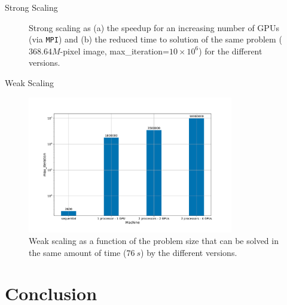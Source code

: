 \documentclass[10pt]{beamer}
\begin{document}
\begin{frame}{Strong Scaling}
\begin{figure}
\begin{subfigure}{.6\textwidth}
			\caption{} 
			\label{fig:strong-tts}
		\end{subfigure}
		\vspace{-0.4cm}
		\caption{Strong scaling as (a) the speedup for an increasing number of GPUs (via \texttt{MPI}) and (b) the reduced time to solution of the same problem ($368.64M$-pixel image, max\_iteration=$10\times10^6$) for the different versions.}
		\label{fig:strong}
	\end{figure}
		
\end{frame}

\begin{frame}{Weak Scaling}
	
	\begin{figure}
		\centering
		\includegraphics[width = 0.8\textwidth, clip, trim={1.5cm 1cm 2cm 2cm}]{weak.pdf}
		\caption{Weak scaling as a function of the problem size that can be solved in the same amount of time ($76~s$) by the different versions.}
		\label{fig:weak}
	\end{figure}
	
\end{frame}



\section{Conclusion}
\end{document}
